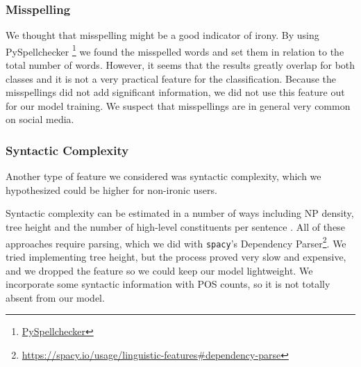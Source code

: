      \subsubsection{Misspelling}
    
    We thought that misspelling might be a good indicator of irony. By using PySpellchecker \footnote{\href{https://pyspellchecker.readthedocs.io/en/latest/}{PySpellchecker}} we found the misspelled words and set them in relation to the total number of words. However, it seems that the results greatly overlap for both classes and it is not a very practical feature for the classification. Because the misspellings did not add significant information, we did not use this feature out for our model training. We suspect that misspellings are in general very common on social media.
    
    
    \subsubsection{Syntactic Complexity}
    
    Another type of feature we considered was syntactic complexity, which we hypothesized could be higher for non-ironic users.
    
    Syntactic complexity can be estimated in a number of ways including NP density, tree height and the number of high-level constituents per sentence \cite{barnwal2017using}. All of these approaches require parsing, which we did with \verb'spacy''s Dependency Parser\footnote{\url{https://spacy.io/usage/linguistic-features#dependency-parse}}. We tried implementing tree height, but the process proved very slow and expensive, and we dropped the feature so we could keep our model lightweight. We incorporate some syntactic information with POS counts, so it is not totally absent from our model.
